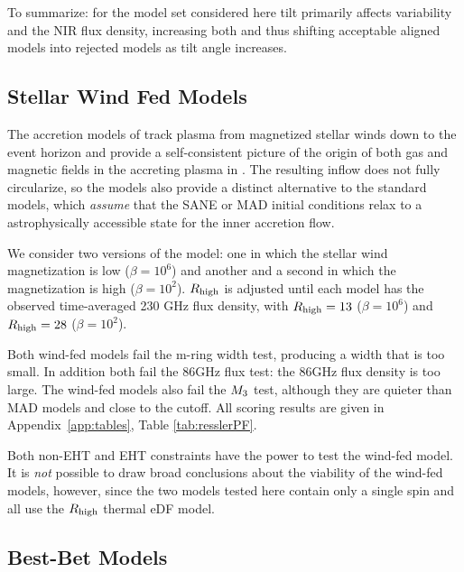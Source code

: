 To summarize: for the model set considered here tilt primarily affects variability and the NIR flux density, increasing both and thus shifting acceptable aligned models into rejected models as tilt angle increases.

\subsection{Stellar Wind Fed Models}

The accretion models of \cite{2020ApJ...896L...6R, 2020MNRAS.492.3272R, 2018MNRAS.478.3544R} track plasma from  magnetized stellar winds down to the event horizon and provide a self-consistent picture of the origin of both gas and magnetic fields in the accreting plasma in \sgra.  The resulting inflow does not fully circularize, so the models also provide a distinct alternative to the standard models, which {\em assume} that the SANE or MAD initial conditions relax to a astrophysically accessible state for the inner accretion flow.

We consider two versions of the model: one in which the stellar wind magnetization is low ($\beta = 10^6$) and another and a second in which the magnetization is high ($\beta = 10^2$). $R_\mathrm{high}$ is adjusted until each model has the observed time-averaged 230 GHz flux density, with $R_\mathrm{high} = 13$ ($\beta = 10^6$) and $R_\mathrm{high} = 28$ ($\beta = 10^2$).

Both wind-fed models fail the m-ring width test, producing a width that is too small.  In addition both fail the 86GHz flux test: the 86GHz flux density is too large.  The wind-fed models also fail the $M_{3}$ test, although they are quieter than MAD models and close to the cutoff.   All scoring results are given in Appendix~\ref{app:tables}, Table \ref{tab:resslerPF}.

Both non-EHT and EHT constraints have the power to test the wind-fed model.  It is {\em not} possible to draw broad conclusions about the viability of the wind-fed models, however, since the two models tested here contain only a single spin and all use the $R_\mathrm{high}$ thermal eDF model.

\subsection{Best-Bet Models}
\label{sec:bestbets}

